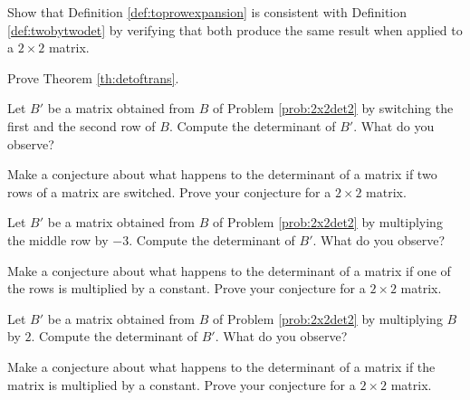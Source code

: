 \documentclass{ximera}
\begin{document}
\begin{problem}\label{prob:toprowexp2x2}
Show that Definition \ref{def:toprowexpansion} is consistent with Definition \ref{def:twobytwodet} by verifying that both produce the same result when applied to a $2\times 2$ matrix.
\end{problem}

\begin{problem}\label{prob:detOfTrans}
    Prove Theorem \ref{th:detoftrans}.
\end{problem}

\begin{problem}\label{prob:detrowswitch}
Let $B'$ be a matrix obtained from $B$ of Problem \ref{prob:2x2det2} by switching the first and the second row of $B$.  Compute the determinant of $B'$.  What do you observe?
\end{problem}

\begin{problem}\label{prob:2x2rowswitchproof}
Make a conjecture about what happens to the determinant of a matrix if two rows of a matrix are switched.  Prove your conjecture for a $2\times 2$ matrix.
\end{problem}

\begin{problem}\label{prob:scalarmultrowdet} Let $B'$ be a matrix obtained from $B$ of Problem \ref{prob:2x2det2} by multiplying the middle row by $-3$.  Compute the determinant of $B'$.  What do you observe?
\end{problem}

\begin{problem}\label{prob:rowtimesconstant2x2proof}
Make a conjecture about what happens to the determinant of a matrix if one of the rows is multiplied by a constant.  Prove your conjecture for a $2\times 2$ matrix.
\end{problem}

\begin{problem}\label{prob:matrixtimesconst}
Let $B'$ be a matrix obtained from $B$ of Problem \ref{prob:2x2det2} by multiplying $B$ by $2$.  Compute the determinant of $B'$.  What do you observe?
\end{problem}

\begin{problem}\label{prob:matrixtimesconstant2x2proof}
Make a conjecture about what happens to the determinant of a matrix if the matrix is multiplied by a constant.  Prove your conjecture for a $2\times 2$ matrix.
\end{problem}
\end{document}
